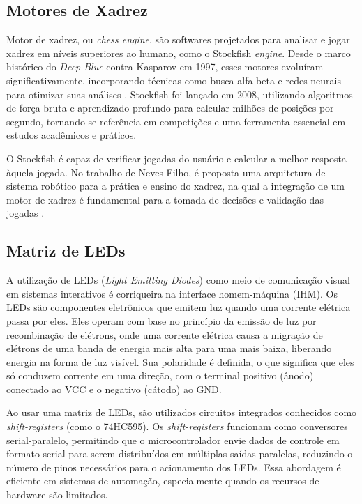 \documentclass[journal]{IEEEtran} %
\begin{document}
\subsection{Motores de Xadrez}

Motor de xadrez, ou \textit{chess engine}, são softwares projetados para analisar e jogar xadrez em níveis superiores ao humano, como o Stockfish \textit{engine}. Desde o marco histórico do \textit{Deep Blue} contra Kasparov em 1997, esses motores evoluíram significativamente, incorporando técnicas como busca alfa-beta e redes neurais para otimizar suas análises \cite{weber1997deepblue}. Stockfish foi lançado em 2008, utilizando algoritmos de força bruta e aprendizado profundo para calcular milhões de posições por segundo, tornando-se referência em competições e uma ferramenta essencial em estudos acadêmicos e práticos.

O Stockfish é capaz de verificar jogadas do usuário e calcular a melhor resposta àquela jogada. No trabalho de Neves Filho, é proposta uma arquitetura de sistema robótico para a prática e ensino do xadrez, na qual a integração de um motor de xadrez é fundamental para a tomada de decisões e validação das jogadas \cite{nevesfilho2021xadrez}. 

\subsection{Matriz de LEDs}

A utilização de LEDs (\textit{Light Emitting Diodes}) como meio de comunicação visual em sistemas interativos é corriqueira na interface homem-máquina (IHM). Os LEDs são componentes eletrônicos que emitem luz quando uma corrente elétrica passa por eles. Eles operam com base no princípio da emissão de luz por recombinação de elétrons, onde uma corrente elétrica causa a migração de elétrons de uma banda de energia mais alta para uma mais baixa, liberando energia na forma de luz visível. Sua polaridade é definida, o que significa que eles só conduzem corrente em uma direção, com o terminal positivo (ânodo) conectado ao VCC e o negativo (cátodo) ao GND.

Ao usar uma matriz de LEDs, são utilizados circuitos integrados conhecidos como \textit{shift-registers} (como o 74HC595). Os \textit{shift-registers} funcionam como conversores serial-paralelo, permitindo que o microcontrolador envie dados de controle em formato serial para serem distribuídos em múltiplas saídas paralelas, reduzindo o número de pinos necessários para o acionamento dos LEDs. Essa abordagem é eficiente em sistemas de automação, especialmente quando os recursos de hardware são limitados.
\end{document}
